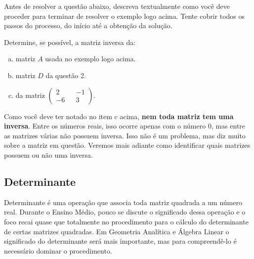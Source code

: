\documentclass[main_estudante.tex]{subfiles}
\begin{document}
\begin{reflita}
Antes de resolver a questão abaixo, descreva textualmente como você deve proceder para terminar de resolver o exemplo logo acima. Tente cobrir todos os passos do processo, do início até a obtenção da solução.
\end{reflita}

\begin{questao}
Determine, se possível, a matriz inversa da:
\begin{enumerate}[a)]
\item matriz $A$ usada no exemplo logo acima.
\item matriz $D$ da questão 2.
\item da matriz $ \begin{pmatrix} 2 && -1 \\ -6 && 3 \end{pmatrix}$.
\end{enumerate}
\end{questao}

Como você deve ter notado no item c acima, \textbf{nem toda matriz tem uma inversa}. Entre os números reais, isso ocorre apenas com o número 0, mas entre as matrizes várias não possuem inversa. Isso não é um problema, mas diz muito sobre a matriz em questão. Veremos mais adiante como identificar quais matrizes possuem ou não uma inversa.

\subsection*{Determinante}

Determinante é uma operação que associa toda matriz quadrada a um número real. Durante o Ensino Médio, pouco se discute o significado dessa operação e o foco recai quase que totalmente no procedimento para o cálculo do determinante de certas matrizes quadradas. Em Geometria Analítica e Álgebra Linear o significado do determinante será mais importante, mas para compreendê-lo é necessário dominar o procedimento.

\noindent{}
\end{document}
